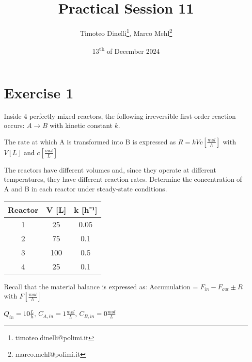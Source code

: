 \documentclass[oneside]{article}
\title{Practical Session 11}
\author{Timoteo Dinelli\footnote{timoteo.dinelli@polimi.it}, Marco Mehl\footnote{marco.mehl@polimi.it}}
\date{13\textsuperscript{th} of December 2024}
\begin{document}
\maketitle

\section*{Exercise 1}
Inside 4 perfectly mixed reactors, the following irreversible first-order reaction
occurs: $A \rightarrow B$ with kinetic constant $k$.

\noindent The rate at which A is transformed into B is expressed as $R = k V c
\left[\frac{mol}{h}\right]$ with $V[L]$ and $c\left[\frac{mol}{L}\right]$

\noindent The reactors have different volumes and, since they operate at different temperatures,
they have different reaction rates. Determine the concentration of A and B in each
reactor under steady-state conditions.

\begin{table}[h]
   \centering
   \begin{tabular}{|c|c|c|}
   \hline
   Reactor & V [L] & k [h⁻¹] \\
   \hline
   1 & 25 & 0.05 \\
   2 & 75 & 0.1 \\
   3 & 100 & 0.5 \\
   4 & 25 & 0.1 \\
   \hline
   \end{tabular}
\end{table}

Recall that the material balance is expressed as: Accumulation = $F_{in} - F_{out} \pm R$
with $F\left[\frac{mol}{h}\right]$

$Q_{in} = 10\frac{L}{h}$, \quad $C_{A,in} = 1\frac{mol}{L}$, \quad $C_{B,in} =
0\frac{mol}{L}$

\begin{center}
\end{center}
\end{document}
